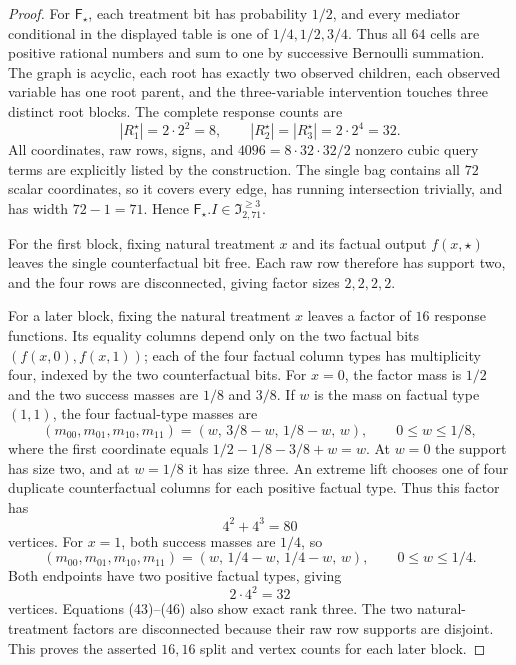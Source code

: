\documentclass{article}
\begin{document}
\begin{proof}
For \(\mathsf F_\star\), each treatment bit has probability \(1/2\), and every mediator conditional in the displayed table is one of \(1/4,1/2,3/4\).  Thus all \(64\) cells are positive rational numbers and sum to one by successive Bernoulli summation.  The graph is acyclic, each root has exactly two observed children, each observed variable has one root parent, and the three-variable intervention touches three distinct root blocks.  The complete response counts are
\[
|R_1^\star|=2\cdot2^2=8,\qquad
|R_2^\star|=|R_3^\star|=2\cdot2^4=32. \tag{42}
\]
All coordinates, raw rows, signs, and \(4096=8\cdot32\cdot32/2\) nonzero cubic query terms are explicitly listed by the construction.  The single bag contains all \(72\) scalar coordinates, so it covers every edge, has running intersection trivially, and has width \(72-1=71\).  Hence \(\mathsf F_\star.I\in\mathfrak I_{2,71}^{\ge3}\).

For the first block, fixing natural treatment \(x\) and its factual output \(f(x,\star)\) leaves the single counterfactual bit free.  Each raw row therefore has support two, and the four rows are disconnected, giving factor sizes \(2,2,2,2\).

For a later block, fixing the natural treatment \(x\) leaves a factor of \(16\) response functions.  Its equality columns depend only on the two factual bits \((f(x,0),f(x,1))\); each of the four factual column types has multiplicity four, indexed by the two counterfactual bits.  For \(x=0\), the factor mass is \(1/2\) and the two success masses are \(1/8\) and \(3/8\).  If \(w\) is the mass on factual type \((1,1)\), the four factual-type masses are
\[
(m_{00},m_{01},m_{10},m_{11})
=(w,\,3/8-w,\,1/8-w,\,w),
\qquad 0\le w\le1/8, \tag{43}
\]
where the first coordinate equals \(1/2-1/8-3/8+w=w\).  At \(w=0\) the support has size two, and at \(w=1/8\) it has size three.  An extreme lift chooses one of four duplicate counterfactual columns for each positive factual type.  Thus this factor has
\[
4^2+4^3=80 \tag{44}
\]
vertices.  For \(x=1\), both success masses are \(1/4\), so
\[
(m_{00},m_{01},m_{10},m_{11})
=(w,\,1/4-w,\,1/4-w,\,w),
\qquad 0\le w\le1/4. \tag{45}
\]
Both endpoints have two positive factual types, giving
\[
2\cdot4^2=32 \tag{46}
\]
vertices.  Equations (43)--(46) also show exact rank three.  The two natural-treatment factors are disconnected because their raw row supports are disjoint.  This proves the asserted \(16,16\) split and vertex counts for each later block.


\end{proof}
\end{document}
